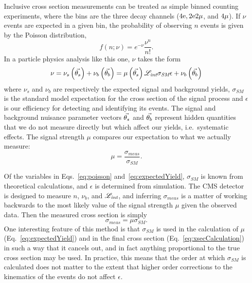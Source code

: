 Inclusive cross section measurements can be treated as simple binned counting experiments, where the bins are the three decay channels ($4\mathrm{e}, 2\mathrm{e}2\mathrm{\mu}$, and $4\mathrm{\mu}$).
If $\nu$ events are expected in a given bin, the probability of observing $n$ events is given by the Poisson distribution,
\begin{equation}\label{eq:poisson}
  f\left(n; \nu\right) = e^{-\nu}\frac{\nu^{n}}{n!}.
\end{equation}
In a particle physics analysis like this one, $\nu$ takes the form
\begin{equation}\label{eq:expectedYield}
  \nu = \nu_s\left(\vec{\theta_s}\right) + \nu_b\left(\vec{\theta_b}\right) = \mu\left(\vec{\theta_s}\right) \mathscr{L}_\textit{int} \sigma_\textit{SM} \epsilon + \nu_b\left(\vec{\theta_b}\right)
\end{equation}
where $\nu_s$ and $\nu_b$ are respectively the expected signal and background yields, $\sigma_\textit{SM}$ is the standard model expectation for the cross section of the signal process and $\epsilon$ is our efficiency for detecting and identifying its events.
The signal and background nuisance parameter vectors $\vec{\theta_s}$ and $\vec{\theta_b}$ represent hidden quantities that we do not measure directly but which affect our yields, i.e.\ systematic effects.
The signal strength $\mu$ compares our expectation to what we actually measure:
\begin{equation}\label{eq:signalStrength}
  \mu = \frac{\sigma_\textit{meas}}{\sigma_\textit{SM}}.
\end{equation}

Of the variables in Eqs.~\ref{eq:poisson} and~\ref{eq:expectedYield},  $\sigma_\textit{SM}$ is known from theoretical calculations, and $\epsilon$ is determined from simulation.
The CMS detector is designed to measure $n$, $\nu_b$, and $\mathscr{L}_\textit{int}$, and inferring $\sigma_\textit{meas}$ is a matter of working backwards to the most likely value of the signal strength $\mu$ given the observed data.
Then the measured cross section is simply
\begin{equation}\label{eq:xsecCalculation}
  \sigma_\textit{meas} = \mu\sigma_\textit{SM}.
\end{equation}
One interesting feature of this method is that $\sigma_\textit{SM}$ is used in the calculation of $\mu$ (Eq.~\ref{eq:expectedYield}) and in the final cross section (Eq.~\ref{eq:xsecCalculation}) in such a way that it cancels out, and in fact anything proportional to the true cross section may be used.
In practice, this means that the order at which $\sigma_\textit{SM}$ is calculated does not matter to the extent that higher order corrections to the kinematics of the events do not affect $\epsilon$.


